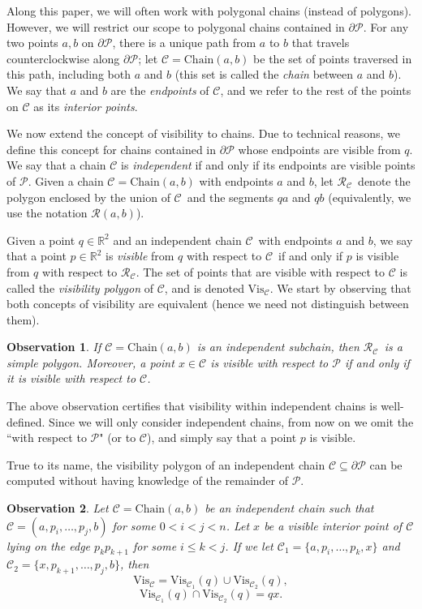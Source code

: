 \documentclass[a4paper]{article}
\newtheorem{observation}{Observation}
\newcommand{\Poly}{\ensuremath{\mathcal{P}}}               \newcommand{\bd}{\ensuremath{\partial \Poly} }                 \newcommand{\Vis}{\ensuremath{\mathrm{Vis}_\Poly}} \newcommand{\VisC}{\ensuremath{\mathrm{Vis}_{\mathcal{C}}}} \newcommand{\VisCprime}{\ensuremath{\mathrm{Vis}_{\mathcal{C'}}}} \newcommand{\E}{\ensuremath{\mathrm{E}}}                    \newcommand{\Rin}{\ensuremath{r}}      \newcommand{\Rout}{\ensuremath{\bar{r}}}      \newcommand{\Hout}{\ensuremath{\bar{h}}}      \newcommand{\chain}{\ensuremath{{\mathrm{Chain}}}}     \newcommand{\region}{\ensuremath{{{\mathcal R}}}}
\newcommand{\regionC}{\ensuremath{{{\mathcal R_{\mathcal C}}}}}
\newcommand{\C}{\ensuremath{{\mathcal C}}}
\begin{document}
Along this paper, we will often work with polygonal chains (instead of polygons). However, we will restrict our scope to polygonal chains contained in $\bd$. For any two points $a,b$ on $\bd$, there is a unique path from $a$ to $b$ that travels counterclockwise along $\bd$; let $\C = \chain(a,b)$ be the set of points traversed in this path, including both $a$ and $b$ (this set is called the {\em chain} between $a$ and $b$). We say that $a$ and $b$ are the \emph{endpoints} of $\mathcal C$, and we refer to the rest of the points on $\mathcal C$ as its \emph{interior points}. 

We now extend the concept of visibility to chains. Due to technical reasons, we define this concept for chains contained in $\bd$ whose endpoints are visible from $q$.  We say that a chain $\C$ is \emph{independent} if and only if its endpoints are visible points of $\Poly$. Given a chain $\C=\chain(a,b)$ with endpoints $a$ and $b$, let \regionC\ denote the polygon enclosed by the union of \C\ and the segments $qa$ and $qb$ (equivalently, we use the notation $\region(a,b)$).

Given a point $q\in \mathbb{R}^2$ and an independent chain \C\ with endpoints $a$ and $b$, we say that a point $p\in \mathbb{R}^2$ is \emph{visible} from $q$ with respect to \C\ if and only if $p$ is visible from $q$ with respect to \regionC.
The set of points that are visible with respect to $\C$ is called the \emph{visibility polygon} of $\C$, and is denoted \VisC. We start by observing that both concepts of visibility are equivalent (hence we need not distinguish between them).

\begin{observation}
If $\mathcal C = \chain(a,b)$ is an independent subchain, then \regionC\ is a simple polygon. Moreover, a point $x\in \C$ is visible with respect to $\Poly$ if and only if it is visible with respect to $\C$. 
\end{observation}

The above observation certifies that visibility within independent chains is well-defined. Since we will only consider independent chains, from now on we omit the ``with respect to $\Poly$" (or to $\C$), and simply say that a point $p$ is visible. 

True to its name, the visibility polygon of an independent chain $\C \subseteq \bd$ can be computed without having knowledge of the remainder of $\Poly$. 

\begin{observation}\label{DivideObs}
Let $\mathcal C = \chain(a,b)$ be an independent chain such that $\C = (a, p_i, \ldots, p_j, b)$ for some $0<i<j<n$. Let $x$ be a visible interior point of $\C$ lying on the edge $p_k p_{k+1}$ for some $i\leq k < j$. If we let $\mathcal C_1 = \{a, p_i, \ldots, p_k, x\}$ and $\mathcal C_2 = \{x, p_{k+1}, \ldots, p_j,b\}$,
then $$\VisC = \mathrm{Vis}_{\mathcal C_1}(q) \cup \mathrm{Vis}_{\mathcal C_2}(q),$$ 
$$\mathrm{Vis}_{\mathcal C_1}(q) \cap \mathrm{Vis}_{\mathcal C_2}(q) = qx.$$
\end{observation}
\end{document}
